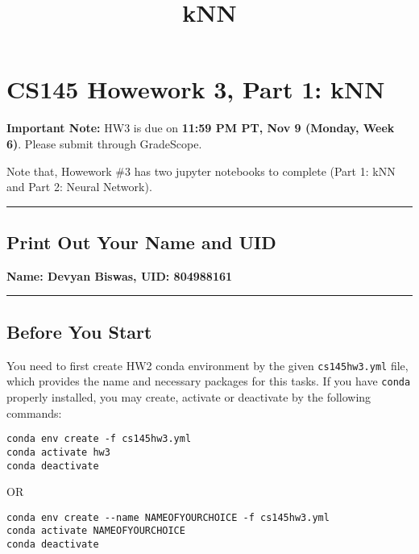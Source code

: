 \documentclass[11pt]{article}
\title{kNN}
\begin{document}
    
    
    \maketitle
    
    

    
    \hypertarget{cs145-howework-3-part-1-knn}{%
\section{CS145 Howework 3, Part 1:
kNN}\label{cs145-howework-3-part-1-knn}}

{ \textbf{Important Note:} } HW3 is due on \textbf{11:59 PM PT, Nov 9
(Monday, Week 6)}. Please submit through GradeScope.

Note that, Howework \#3 has two jupyter notebooks to complete (Part 1:
kNN and Part 2: Neural Network).

\begin{center}\rule{0.5\linewidth}{0.5pt}\end{center}

\hypertarget{print-out-your-name-and-uid}{%
\subsection{Print Out Your Name and
UID}\label{print-out-your-name-and-uid}}

{ \textbf{Name: Devyan Biswas, UID: 804988161} }

\begin{center}\rule{0.5\linewidth}{0.5pt}\end{center}

\hypertarget{before-you-start}{%
\subsection{Before You Start}\label{before-you-start}}

You need to first create HW2 conda environment by the given
\texttt{cs145hw3.yml} file, which provides the name and necessary
packages for this tasks. If you have \texttt{conda} properly installed,
you may create, activate or deactivate by the following commands:

\begin{verbatim}
conda env create -f cs145hw3.yml
conda activate hw3
conda deactivate
\end{verbatim}

OR

\begin{verbatim}
conda env create --name NAMEOFYOURCHOICE -f cs145hw3.yml 
conda activate NAMEOFYOURCHOICE
conda deactivate
\end{verbatim}
\end{document}
